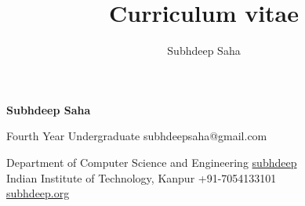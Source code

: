 \documentclass[9pt]{extarticle}
\title{Curriculum vitae}
\author{Subhdeep Saha}
\begin{document}
{\Huge\textbf{\sc Subhdeep Saha}}
\hfill


Fourth Year Undergraduate
\hfill
subhdeepsaha@gmail.com \faEnvelope

Department of Computer Science and Engineering
\hfill
\href{https://github.com/subhdeep}{subhdeep \faGithub}\\

Indian Institute of Technology, Kanpur
\hfill
+91-7054133101 \faMobile \\
\hfill
\href{https://subhdeep.org}{subhdeep.org \faHome}

\begin{minipage}[t]{0.49\textwidth}
  \vspace{2mm}
  
  
\end{minipage}
\hfill
\begin{minipage}[t]{0.49\textwidth}
  \vspace{2mm}
  
  \vspace{-4mm}
  
  
  \vspace{-2mm}
  
\end{minipage}
\end{document}
